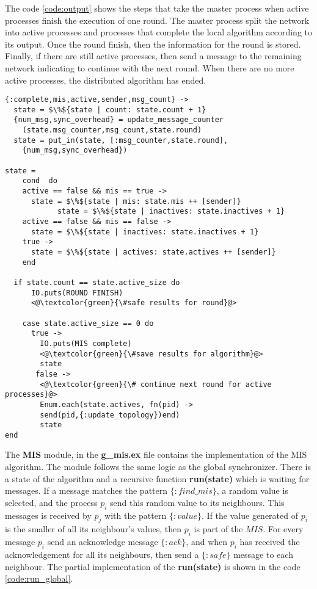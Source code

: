 The code \ref{code:output} shows the steps that take the master process when active processes finish the execution of one round. The master process split the network into active processes and processes that complete the local algorithm according to its output.  Once the round finish, then the information for the round is stored. Finally, if there are still active processes, then send a message to the remaining network indicating to continue with the next round. When there are no more active processes, the distributed algorithm has ended.    
 
 
\begin{lstlisting}[frame=single, columns=fullflexible, mathescape=true, caption= Output of processes per round  , label = code:output]
{:complete,mis,active,sender,msg_count} ->
  state = $\%${state | count: state.count + 1}
  {num_msg,sync_overhead} = update_message_counter
    (state.msg_counter,msg_count,state.round)
  state = put_in(state, [:msg_counter,state.round],
    {num_msg,sync_overhead})

state =
    cond  do
    active == false && mis == true ->  
      state = $\%${state | mis: state.mis ++ [sender]}
            state = $\%${state | inactives: state.inactives + 1}
    active == false && mis == false ->
      state = $\%${state | inactives: state.inactives + 1}
    true ->  
      state = $\%${state | actives: state.actives ++ [sender]}
    end

  if state.count == state.active_size do
      IO.puts(ROUND FINISH)
      <@\textcolor{green}{\#safe results for round}@> 
    
    case state.active_size == 0 do
      true ->
        IO.puts(MIS complete)
        <@\textcolor{green}{\#save results for algorithm}@> 
        state
       false ->
        <@\textcolor{green}{\# continue next round for active processes}@> 
        Enum.each(state.actives, fn(pid) ->
        send(pid,{:update_topology})end)
        state
end
\end{lstlisting}



The \textbf{MIS} module, in the \textbf{g\_mis.ex} file contains the implementation of the MIS algorithm. The module follows the same logic as the global synchronizer. There is a state of the algorithm and a recursive function \textbf{run(state)} which is waiting for messages. If a message matches the pattern $\{:find\_mis\}$, a random value is selected, and the process $p_i$ send this random value to its neighbours. This messages is received by $p_j$ with the pattern $\{:value\}$. If the value generated of $p_i$ is the smaller of all its neighbour's values, then $p_i$ is part of the $MIS$. For every message $p_i$ send an acknowledge message $\{:ack\}$, and when $p_i$ has received the acknowledgement for all its neighbours, then send a $\{:safe\}$ message to each neighbour. The partial implementation of the \textbf{run(state)} is shown in the code \ref{code:run_global}.

